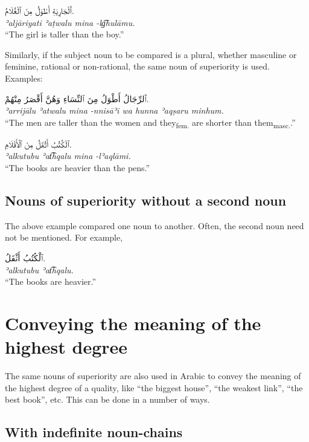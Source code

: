 \documentclass[
  10pt,
]{book}
\begin{document}
\foreignlanguage{arabic}{ٱَلْجَارِيَةِ أَطْوَلُ مِنَ ٱلْغُلَامُ.}\\
\emph{ʾaljāriyati ʾaṭwalu mina -lg͡hulāmu.}\\
\enquote{The girl is taller than the boy.}

Similarly, if the subject noun to be compared is a plural, whether masculine or feminine, rational or non-rational, the same noun of superiority is used. Examples:

\foreignlanguage{arabic}{ٱَلرِّجَالُ أَطْوَلُ مِنَ ٱلنِّسَاءِ وَهُنَّ أَقْصَرُ مِنْهُمْ.}\\
\emph{ʾarrijālu ʾatwalu mina -nnisāʾi wa hunna ʾaqṣaru minhum.}\\
\enquote{The men are taller than the women and they\textsubscript{fem.} are shorter than them\textsubscript{masc.}.}

\foreignlanguage{arabic}{ٱلْکُتُبُ أَثُقَلُ مِنَ ٱلْأَقْلَامِ.}\\
\emph{ʾalkutubu ʾat͡hqalu mina -lʾaqlāmi.}\\
\enquote{The books are heavier than the pens.}

\subsection{Nouns of superiority without a second noun}\label{nouns-of-superiority-without-a-second-noun}

The above example compared one noun to another. Often, the second noun need not be mentioned. For example,

\foreignlanguage{arabic}{ٱلْکُتُبُ أَثْقَلُ.}\\
\emph{ʾalkutubu ʾat͡hqalu.}\\
\enquote{The books are heavier.}

\section{Conveying the meaning of the highest degree}\label{conveying-the-meaning-of-the-highest-degree}

The same nouns of superiority are also used in Arabic to convey the meaning of the highest degree of a quality, like \enquote{the biggest house}, \enquote{the weakest link}, \enquote{the best book}, etc. This can be done in a number of ways.

\subsection{With indefinite noun-chains}\label{with-indefinite-noun-chains}
\end{document}
